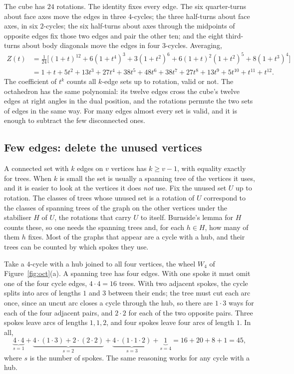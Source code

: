 \documentclass[11pt]{amsart}
\theoremstyle{remark}
\begin{document}
The cube has $24$ rotations. The identity fixes every edge. The six quarter-turns about face axes move the edges in three $4$-cycles; the three half-turns about face axes, in six $2$-cycles; the six half-turns about axes through the midpoints of opposite edges fix those two edges and pair the other ten; and the eight third-turns about body diagonals move the edges in four $3$-cycles. Averaging,
\begin{equation}\label{eq:Z}
\begin{aligned}
Z(t)&=\tfrac1{24}\bigl[(1+t)^{12}+6(1+t^4)^3+3(1+t^2)^6+6(1+t)^2(1+t^2)^5+8(1+t^3)^4\bigr]\\
&=1+t+5t^2+13t^3+27t^4+38t^5+48t^6+38t^7+27t^8+13t^9+5t^{10}+t^{11}+t^{12}.
\end{aligned}
\end{equation}
The coefficient of $t^k$ counts all $k$-edge sets up to rotation, valid or not. The octahedron has the same polynomial: its twelve edges cross the cube's twelve edges at right angles in the dual position, and the rotations permute the two sets of edges in the same way. For many edges almost every set is valid, and it is enough to subtract the few disconnected ones.

\subsection{Few edges: delete the unused vertices}

A connected set with $k$ edges on $v$ vertices has $k\ge v-1$, with equality exactly for trees. When $k$ is small the set is usually a spanning tree of the vertices it uses, and it is easier to look at the vertices it does \emph{not} use. Fix the unused set $U$ up to rotation. The classes of trees whose unused set is a rotation of $U$ correspond to the classes of spanning trees of the graph on the other vertices under the stabiliser $H$ of $U$, the rotations that carry $U$ to itself. Burnside's lemma for $H$ counts these, so one needs the spanning trees and, for each $h\in H$, how many of them $h$ fixes. Most of the graphs that appear are a cycle with a hub, and their trees can be counted by which spokes they use.

Take a $4$-cycle with a hub joined to all four vertices, the wheel $W_4$ of Figure~\ref{fig:oct}(a). A spanning tree has four edges. With one spoke it must omit one of the four cycle edges, $4\cdot4=16$ trees. With two adjacent spokes, the cycle splits into arcs of lengths $1$ and $3$ between their ends; the tree must cut each arc once, since an uncut arc closes a cycle through the hub, so there are $1\cdot3$ ways for each of the four adjacent pairs, and $2\cdot2$ for each of the two opposite pairs. Three spokes leave arcs of lengths $1,1,2$, and four spokes leave four arcs of length $1$. In all,
\[
\underbrace{4\cdot4}_{s=1}+\underbrace{4\cdot(1\cdot3)+2\cdot(2\cdot2)}_{s=2}+\underbrace{4\cdot(1\cdot1\cdot2)}_{s=3}+\underbrace{1}_{s=4}=16+20+8+1=45,
\]
where $s$ is the number of spokes. The same reasoning works for any cycle with a hub.
\end{document}
